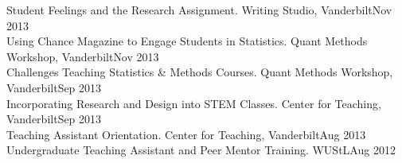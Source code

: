 Student Feelings and the Research Assignment. Writing Studio, Vanderbilt\hfill{Nov 2013}\smallskip\\
Using Chance Magazine to Engage Students in Statistics. Quant Methods Workshop, Vanderbilt\hfill{Nov 2013}\smallskip\\
Challenges Teaching Statistics \& Methods Courses. Quant Methods Workshop, Vanderbilt\hfill{Sep 2013}\smallskip\\
Incorporating Research and Design into STEM Classes. Center for Teaching, Vanderbilt\hfill{Sep 2013}\smallskip\\
Teaching Assistant Orientation. Center for Teaching, Vanderbilt\hfill{Aug 2013}\smallskip\\
Undergraduate Teaching Assistant and Peer Mentor Training. WUStL\hfill{Aug 2012}